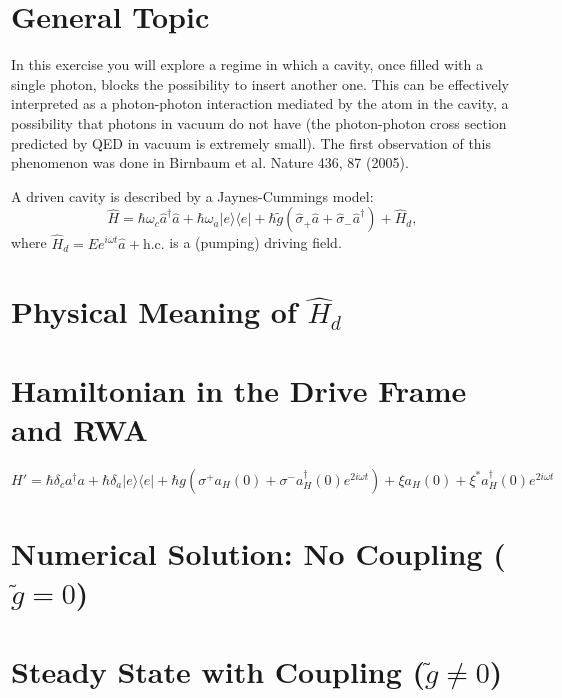\documentclass[12pt,a4paper]{article}
\begin{document}
\newpage
\tableofcontents 
\newpage

\section*{General Topic}
In this exercise you will explore a regime in which a cavity, once filled with a single photon, blocks the possibility to insert another one. This can be effectively interpreted as a photon-photon interaction mediated by the atom in the cavity, a possibility that photons in vacuum do not have (the photon-photon cross section predicted by QED in vacuum is extremely small). The first observation of this phenomenon was done in Birnbaum et al. Nature 436, 87 (2005).

A driven cavity is described by a Jaynes-Cummings model:
\begin{equation*}
    \hat{H} = \hbar \omega_c \hat{a}^\dagger \hat{a} + \hbar \omega_a |e\rangle\langle e| + \hbar \tilde{g}(\hat{\sigma}_+ \hat{a} + \hat{\sigma}_- \hat{a}^\dagger) + \hat{H}_d,
\end{equation*}
where $\hat{H}_d = E e^{i \omega t} \hat{a} + \text{h.c.}$ is a (pumping) driving field.

\section{Physical Meaning of $\hat{H}_d$}

\section{Hamiltonian in the Drive Frame and RWA}
$$H' = \hbar \delta_c a^\dagger a + \hbar \delta_a |e\rangle \langle e| + \hbar g (\sigma^+ a_H(0) + \sigma^- a_H^\dagger (0) e^{2i\omega t}) + \xi a_H(0) + \xi^* a_H^\dagger(0) e^{2i\omega t}$$
\section{Numerical Solution: No Coupling ($\tilde{g}=0$)}

\section{Steady State with Coupling ($\tilde{g} \neq 0$)}
\end{document}
